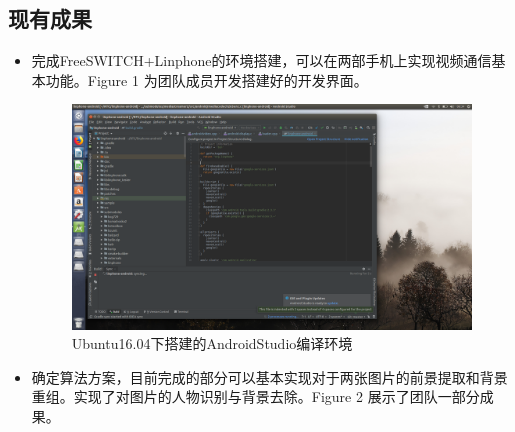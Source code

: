 \documentclass[14pt]{extarticle}
\newcommand{\<}{\langle}
\renewcommand{\>}{\rangle}
\theoremstyle{definition}
\begin{document}
\subsection{现有成果}
\begin{itemize}
\item 完成FreeSWITCH+Linphone的环境搭建，可以在两部手机上实现视频通信基本功能。Figure 1 为团队成员开发搭建好的开发界面。
\begin{figure}[H]
    \centering
    \includegraphics[scale=0.2]{images/environment.jpg}
    \caption{Ubuntu16.04下搭建的AndroidStudio编译环境}
\end{figure}
\item 确定算法方案，目前完成的部分可以基本实现对于两张图片的前景提取和背景重组。实现了对图片的人物识别与背景去除。Figure 2 展示了团队一部分成果。
\begin{figure}[H]
    \centering
\end{figure}
\end{itemize}
\end{document}
